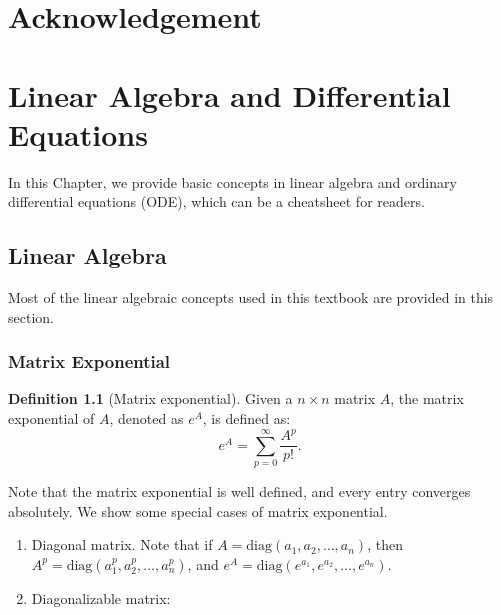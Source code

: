 \documentclass[
]{book}
\theoremstyle{definition}
\newtheorem{definition}{Definition}[chapter]
\theoremstyle{definition}
\theoremstyle{definition}
\theoremstyle{definition}
\theoremstyle{remark}
\begin{document}
\hypertarget{acknowledgement}{%
\chapter*{Acknowledgement}\label{acknowledgement}}

\hypertarget{appendix-appendix}{%
\appendix}


\hypertarget{linear-algebra-and-differential-equations}{%
\chapter{Linear Algebra and Differential Equations}\label{linear-algebra-and-differential-equations}}

In this Chapter, we provide basic concepts in linear algebra and ordinary differential equations (ODE), which can be a cheatsheet for readers.

\hypertarget{linear-algebra}{%
\section{Linear Algebra}\label{linear-algebra}}

Most of the linear algebraic concepts used in this textbook are provided in this section.

\hypertarget{matrix-exponential}{%
\subsection{Matrix Exponential}\label{matrix-exponential}}

\begin{definition}[Matrix exponential]
\protect\hypertarget{def:matrixexp}{}\label{def:matrixexp}Given a \(n\times n\) matrix \(A\), the matrix exponential of \(A\), denoted as \(e^A\), is defined as:
\[e^A = \sum_{p=0}^\infty \frac{A^p}{p!}.\]
\end{definition}

Note that the matrix exponential is well defined, and every entry converges absolutely. We show some special cases of matrix exponential.

\begin{enumerate}
\def\labelenumi{\arabic{enumi}.}
\item
  Diagonal matrix. Note that if \(A=\text{diag}(a_1,a_2,\ldots,a_n)\), then \(A^p=\text{diag}(a_1^p,a_2^p,\ldots,a_n^p)\), and \(e^A=\text{diag}(e^{a_1},e^{a_2},\ldots,e^{a_n})\).
\item
  Diagonalizable matrix:
\end{enumerate}
\end{document}

